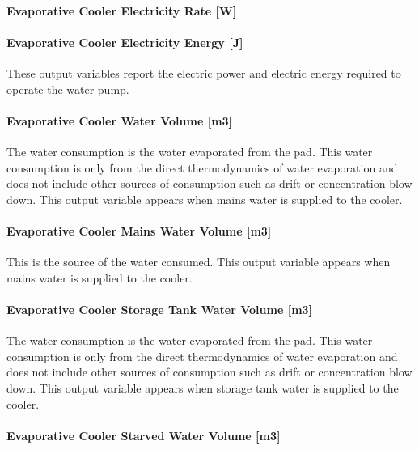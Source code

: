 \paragraph{Evaporative Cooler Electricity Rate {[}W{]}}\label{evaporative-cooler-electric-powerw}

\paragraph{Evaporative Cooler Electricity Energy {[}J{]}}\label{evaporative-cooler-electric-energy-j}

These output variables report the electric power and electric energy required to operate the water pump.

\paragraph{Evaporative Cooler Water Volume {[}m3{]}}\label{evaporative-cooler-water-volume-m3}

The water consumption is the water evaporated from the pad. This water consumption is only from the direct thermodynamics of water evaporation and does not include other sources of consumption such as drift or concentration blow down. This output variable appears when mains water is supplied to the cooler.

\paragraph{Evaporative Cooler Mains Water Volume {[}m3{]}}\label{evaporative-cooler-mains-water-volume-m3}

This is the source of the water consumed. This output variable appears when mains water is supplied to the cooler.

\paragraph{Evaporative Cooler Storage Tank Water Volume {[}m3{]}}\label{evaporative-cooler-storage-tank-water-volume-m3}

The water consumption is the water evaporated from the pad. This water consumption is only from the direct thermodynamics of water evaporation and does not include other sources of consumption such as drift or concentration blow down. This output variable appears when storage tank water is supplied to the cooler.

\paragraph{Evaporative Cooler Starved Water Volume {[}m3{]}}\label{evaporative-cooler-starved-water-volume-m3}

